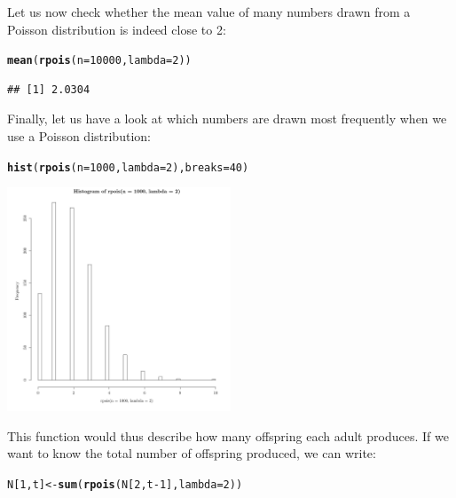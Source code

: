 \documentclass{article}\usepackage[]{graphicx}\usepackage[]{color}
\makeatletter
\newcommand{\hlnum}[1]{\textcolor[rgb]{0.686,0.059,0.569}{#1}}%
\newcommand{\hlopt}[1]{\textcolor[rgb]{0,0,0}{#1}}%
\newcommand{\hlstd}[1]{\textcolor[rgb]{0.345,0.345,0.345}{#1}}%
\newcommand{\hlkwb}[1]{\textcolor[rgb]{0.69,0.353,0.396}{#1}}%
\newcommand{\hlkwc}[1]{\textcolor[rgb]{0.333,0.667,0.333}{#1}}%
\newcommand{\hlkwd}[1]{\textcolor[rgb]{0.737,0.353,0.396}{\textbf{#1}}}%
\newenvironment{kframe}{%
 \def\at@end@of@kframe{}%
 \ifinner\ifhmode%
  \def\at@end@of@kframe{\end{minipage}}%
  \begin{minipage}{\columnwidth}%
 \fi\fi%
 \def\FrameCommand##1{\hskip\@totalleftmargin \hskip-\fboxsep
 \colorbox{shadecolor}{##1}\hskip-\fboxsep
     \hskip-\linewidth \hskip-\@totalleftmargin \hskip\columnwidth}%
 \MakeFramed {\advance\hsize-\width
   \@totalleftmargin\z@ \linewidth\hsize
   \@setminipage}}%
 {\par\unskip\endMakeFramed%
 \at@end@of@kframe}
\newenvironment{knitrout}{}{} %
\makeatother
\begin{document}
Let us now check whether the mean value of many numbers drawn from a Poisson distribution is indeed close to 2:
\begin{knitrout}
\color{fgcolor}\begin{kframe}
\begin{alltt}
\hlkwd{mean}\hlstd{(}\hlkwd{rpois}\hlstd{(}\hlkwc{n}\hlstd{=}\hlnum{10000}\hlstd{,}\hlkwc{lambda}\hlstd{=}\hlnum{2}\hlstd{))}
\end{alltt}
\begin{verbatim}
## [1] 2.0304
\end{verbatim}
\end{kframe}
\end{knitrout}
Finally, let us have a look at which numbers are drawn most frequently when we use a Poisson distribution:
\begin{knitrout}
\color{fgcolor}\begin{kframe}
\begin{alltt}
\hlkwd{hist}\hlstd{(}\hlkwd{rpois}\hlstd{(}\hlkwc{n}\hlstd{=}\hlnum{1000}\hlstd{,}\hlkwc{lambda}\hlstd{=}\hlnum{2}\hlstd{),}\hlkwc{breaks}\hlstd{=}\hlnum{40}\hlstd{)}
\end{alltt}
\end{kframe}

{\centering \includegraphics[width=0.5\textwidth]{figure/dice7-1} 

}



\end{knitrout}
This function would thus describe how many offspring each adult produces. If we want to know the total number of offspring produced, we can write:
\begin{knitrout}
\color{fgcolor}\begin{kframe}
\begin{alltt}
\hlstd{N[}\hlnum{1}\hlstd{,t]}\hlkwb{<-}\hlkwd{sum}\hlstd{(}\hlkwd{rpois}\hlstd{(N[}\hlnum{2}\hlstd{,t}\hlopt{-}\hlnum{1}\hlstd{],}\hlkwc{lambda}\hlstd{=}\hlnum{2}\hlstd{))}
\end{alltt}
\end{kframe}
\end{knitrout}
\end{document}

